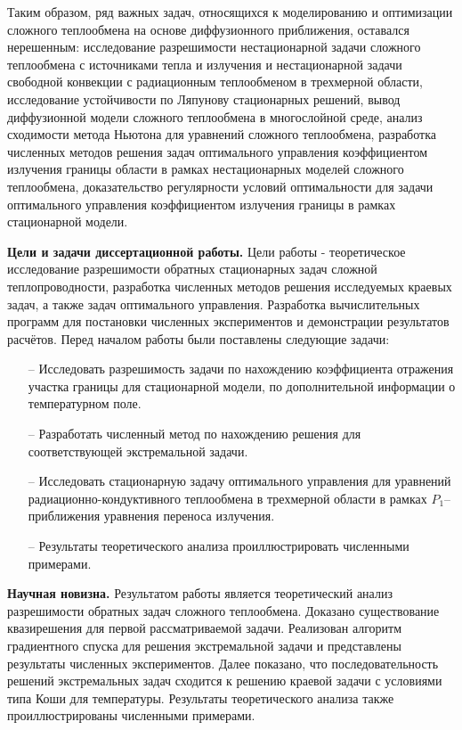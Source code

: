Таким образом, ряд важных задач, относящихся к моделированию и оптимизации сложного теплообмена на основе
диффузионного приближения, оставался нерешенным: исследование разрешимости нестационарной задачи сложного
теплообмена с источниками тепла и излучения и нестационарной задачи свободной конвекции с радиационным
теплообменом в трехмерной области, исследование устойчивости по Ляпунову стационарных решений,
вывод диффузионной модели сложного теплообмена в многослойной среде, анализ сходимости метода Ньютона
для уравнений сложного теплообмена, разработка численных методов решения задач оптимального управления
коэффициентом излучения границы области в рамках нестационарных
моделей сложного теплообмена, доказательство регулярности условий оптимальности для задачи
оптимального управления коэффициентом излучения границы в рамках стационарной модели.


\textbf{Цели и задачи диссертационной работы.}
Цели работы - теоретическое исследование разрешимости обратных стационарных задач сложной теплопроводности,
разработка численных методов решения исследуемых краевых задач, а также задач оптимального управления.
Разработка вычислительных программ для постановки численных экспериментов и демонстрации результатов расчётов.
Перед началом работы были поставлены следующие задачи:
\begin{itemize}
  \item[--] Исследовать разрешимость задачи по нахождению коэффициента отражения участка границы для
  стационарной модели, по дополнительной информации о температурном поле.
  \item[--] Разработать численный метод по нахождению решения для соответствующей экстремальной задачи.
  \item[--] Исследовать стационарную задачу оптимального управления для уравнений радиационно-кондуктивного
  теплообмена в трехмерной области в рамках $P_1$–приближения уравнения переноса излучения.
  \item[--] Результаты теоретического анализа проиллюстрировать численными примерами.
\end{itemize}


\textbf{Научная новизна.}
Результатом работы является теоретический анализ
разрешимости обратных задач сложного теплообмена.
Доказано существование квазирешения для первой рассматриваемой задачи.
Реализован алгоритм градиентного спуска для решения экстремальной задачи и представлены результаты
численных экспериментов.
Далее показано, что последовательность решений экстремальных задач сходится к решению
краевой задачи с условиями типа Коши для температуры.
Результаты теоретического анализа также проиллюстрированы численными примерами.

